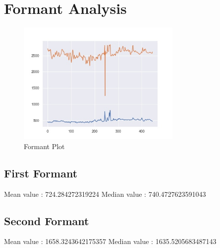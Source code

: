 \documentclass{article}%
\begin{document}
%
\pagebreak[4]

%
\section{Formant Analysis}%
\label{sec:FormantAnalysis}%


\begin{figure}[h!]%
\centering%
\includegraphics[width=300px]{formant.jpg}%
\caption{Formant Plot}%
\end{figure}

%
\subsection{First Formant}%
\label{subsec:FirstFormant}%
Mean value : 724.284272319224%
\newline%
Median value : 740.4727623591043

%
\subsection{Second Formant}%
\label{subsec:SecondFormant}%
Mean value : 1658.3243642175357%
\newline%
Median value : 1635.5205683487143

%
\end{document}
